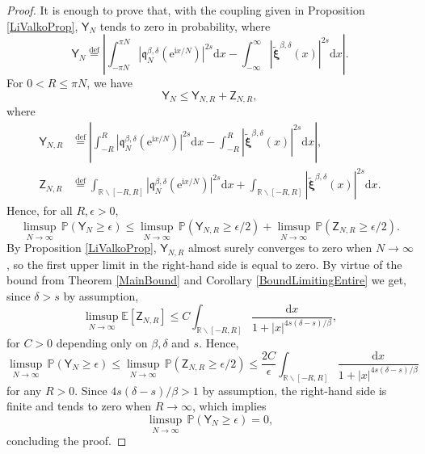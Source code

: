 \documentclass[]{article}
\begin{document}
\begin{proof}
It is enough to prove that, with the coupling 
given in Proposition \ref{LiValkoProp}, 
$\mathsf{Y}_{N}$ tends to zero in probability, where
$$\mathsf{Y}_{N} \overset{\mathrm{def}}{=} \left| \int_{-\pi N}^{\pi N} \left|\mathfrak{q}_N^{\beta,\delta}(\mathrm{e}^{\mathrm{i}x/N})\right|^{2s}\mathrm{d}x
- \int_{-\infty}^\infty \left|\tilde{\boldsymbol{\xi}}^{\beta,\delta}(x)\right|^{2s}\mathrm{d}x \right|.
$$
For $0 < R \leq \pi N$, we have 
$$\mathsf{Y}_{N} \leq \mathsf{Y}_{N,R}
+  \mathsf{Z}_{N,R},$$
where 
\begin{align*}
\mathsf{Y}_{N,R}&\overset{\mathrm{def}}{=}\left|\int_{-R}^R \left|\mathfrak{q}_N^{\beta,\delta}(\mathrm{e}^{\mathrm{i}x/N})\right|^{2s}\mathrm{d}x-\int_{-R}^{R}\left|\tilde{\boldsymbol{\xi}}^{\beta,\delta}(x)\right|^{2s}\mathrm{d}x\right|,\\
\mathsf{Z}_{N,R}&\overset{\mathrm{def}}{=}\int_{\mathbb{R}\backslash[-R,R]} \left|\mathfrak{q}_N^{\beta,\delta}(\mathrm{e}^{\mathrm{i}x/N})\right|^{2s}\mathrm{d}x + \int_{\mathbb{R}\backslash[-R,R]} \left|\tilde{\boldsymbol{\xi}}^{\beta,\delta}(x)\right|^{2s}\mathrm{d}x. 
\end{align*}
Hence, for all $R, \epsilon > 0$, 
$$\underset{N \rightarrow \infty}{\limsup} 
\, \mathbb{P} (\mathsf{Y}_{N} \geq \epsilon) 
\leq \underset{N \rightarrow \infty}{\limsup} 
\, \mathbb{P} (\mathsf{Y}_{N,R} \geq \epsilon/2)  +  \underset{N \rightarrow \infty}{\limsup} 
\, \mathbb{P} (\mathsf{Z}_{N,R} \geq \epsilon/2).$$
By Proposition \ref{LiValkoProp}, 
$\mathsf{Y}_{N,R}$ almost surely converges to zero when $N \to \infty$, so the first upper limit in the right-hand side is equal to zero. 
By virtue of the bound from Theorem \ref{MainBound} and Corollary \ref{BoundLimitingEntire} we get, since $\delta > s$ by assumption, 
\begin{equation*}
 \limsup_{N \to \infty}\mathbb{E}\left[\mathsf{Z}_{N,R}\right]\le  C\int_{\mathbb{R}\backslash[-R,R]} \frac{\mathrm{d}x}{1+|x|^{4s(\delta-s)/\beta}},
\end{equation*}
for $C > 0$ depending only on $\beta, \delta$ and $s$. 
Hence, 
$$\underset{N \rightarrow \infty}{\limsup} 
\, \mathbb{P} (\mathsf{Y}_{N} \geq \epsilon)  \leq \underset{N \rightarrow \infty}{\limsup} 
\, \mathbb{P} (\mathsf{Z}_{N,R} \geq \epsilon/2)
\leq \frac{2 C}{\epsilon} \int_{\mathbb{R}\backslash[-R,R]} \frac{\mathrm{d}x}{1+|x|^{4s(\delta-s)/\beta}}
$$
for any $R > 0$. 
Since $4s (\delta - s) / \beta > 1$ by assumption, the right-hand side is finite and tends to zero when $R \to \infty$, which implies 
$$\underset{N \rightarrow \infty}{\limsup} 
\, \mathbb{P} (\mathsf{Y}_{N} \geq \epsilon)  =  0,$$
concluding the proof.
\end{proof}
\end{document}
